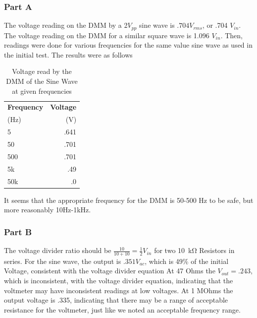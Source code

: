 \documentclass[10pt]{article}
\begin{document}
\subsubsection{Part A}

	 The voltage reading on the DMM by a 2$V_{pp}$ sine wave is $.704 V_{rms}$, or .704 $V_{in}$. The voltage reading on the DMM for a similar square wave is 1.096 $V_{in}$. Then, readings were done for various frequencies for the same value sine wave as used in the initial test. The results were as follows
	\begin{table}[H]
		\begin{center}
			\caption{Voltage read by the DMM of the Sine Wave at given frequencies}
			\label{tab: 31A}
			\begin{tabular}{l|r}
				\textbf{Frequency} & \textbf{Voltage}\\
				(Hz) & (V)\\
				\hline
				5 & .641\\
				50 & .701\\
				500 & .701\\
				5k & .49\\
				50k & .0\\
			\end{tabular}
		\end{center}
	\end{table}
	It seems that the appropriate frequency for the DMM is 50-500 Hz to be safe, but more reasonably 10Hz-1kHz.
\subsubsection{Part B}
	 The voltage divider ratio should be $\frac{10}{10+10} = \frac{1}{2} V_{in}$  for two \SI{10}{\kilo\ohm} Resistors in series. For the sine wave, the output is $.351 V_{ac}$, which is 49\% of the initial Voltage, consistent with the voltage divider equation 
	 At 47 Ohms the $V_{out} = .243$, which is inconsistent, with the voltage divider equation, indicating that the voltmeter may have inconsistent readings at low voltages. 
	 At 1 MOhms the output voltage is .335, indicating that there may be a range of acceptable resistance for the voltmeter, just like we noted an acceptable frequency range.
\end{document}
